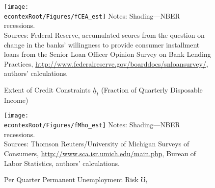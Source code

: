 \documentclass[titlepage]{\econtex}
\begin{document}
\begin{figure}
\caption{Extent of Credit Constraints $\underline{h}_t$ (Fraction of Quarterly Disposable Income) \label{tMbar}}
\texttt{[image: \\econtexRoot/Figures/fCEA\_est]}
\footnotesize
Notes: Shading---NBER recessions.\\[0mm]
\tiny Sources: Federal Reserve, accumulated scores from the question on change in the banks' willingness to provide consumer installment loans from the Senior Loan Officer Opinion Survey on Bank Lending Practices, \url{http://www.federalreserve.gov/boarddocs/snloansurvey/}, authors' calculations.
\end{figure}

\begin{figure}
\caption{Per Quarter Permanent Unemployment Risk $\mho_t$  \label{tMhoRescaled}}
\texttt{[image: \\econtexRoot/Figures/fMho\_est]}
\footnotesize
Notes: Shading---NBER recessions.\\[0mm]
\tiny Sources: Thomson Reuters/University of Michigan Surveys of Consumers, \url{http://www.sca.isr.umich.edu/main.php}, Bureau of Labor Statistics, authors' calculations.
\end{figure}
\end{document}
